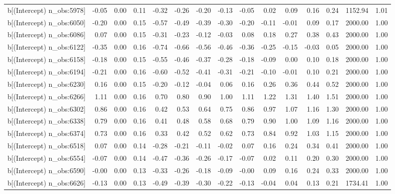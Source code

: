 \begin{table}[ht]
\begin{tabular}{rrrrrrrrrrrrrrr}
  b[(Intercept) n\_obs:5978] & -0.05 & 0.00 & 0.11 & -0.32 & -0.26 & -0.20 & -0.13 & -0.05 & 0.02 & 0.09 & 0.16 & 0.24 & 1152.94 & 1.01 \\ 
  b[(Intercept) n\_obs:6050] & -0.20 & 0.00 & 0.15 & -0.57 & -0.49 & -0.39 & -0.30 & -0.20 & -0.11 & -0.01 & 0.09 & 0.17 & 2000.00 & 1.00 \\ 
  b[(Intercept) n\_obs:6086] & 0.07 & 0.00 & 0.15 & -0.31 & -0.23 & -0.12 & -0.03 & 0.08 & 0.18 & 0.27 & 0.38 & 0.43 & 2000.00 & 1.00 \\ 
  b[(Intercept) n\_obs:6122] & -0.35 & 0.00 & 0.16 & -0.74 & -0.66 & -0.56 & -0.46 & -0.36 & -0.25 & -0.15 & -0.03 & 0.05 & 2000.00 & 1.00 \\ 
  b[(Intercept) n\_obs:6158] & -0.18 & 0.00 & 0.15 & -0.55 & -0.46 & -0.37 & -0.28 & -0.18 & -0.09 & 0.00 & 0.10 & 0.18 & 2000.00 & 1.00 \\ 
  b[(Intercept) n\_obs:6194] & -0.21 & 0.00 & 0.16 & -0.60 & -0.52 & -0.41 & -0.31 & -0.21 & -0.10 & -0.01 & 0.10 & 0.21 & 2000.00 & 1.00 \\ 
  b[(Intercept) n\_obs:6230] & 0.16 & 0.00 & 0.15 & -0.20 & -0.12 & -0.04 & 0.06 & 0.16 & 0.26 & 0.36 & 0.44 & 0.52 & 2000.00 & 1.00 \\ 
  b[(Intercept) n\_obs:6266] & 1.11 & 0.00 & 0.16 & 0.70 & 0.80 & 0.90 & 1.00 & 1.11 & 1.22 & 1.31 & 1.40 & 1.51 & 2000.00 & 1.00 \\ 
  b[(Intercept) n\_obs:6302] & 0.86 & 0.00 & 0.16 & 0.42 & 0.53 & 0.64 & 0.75 & 0.86 & 0.97 & 1.07 & 1.16 & 1.30 & 2000.00 & 1.00 \\ 
  b[(Intercept) n\_obs:6338] & 0.79 & 0.00 & 0.16 & 0.41 & 0.48 & 0.58 & 0.68 & 0.79 & 0.90 & 1.00 & 1.09 & 1.16 & 2000.00 & 1.00 \\ 
  b[(Intercept) n\_obs:6374] & 0.73 & 0.00 & 0.16 & 0.33 & 0.42 & 0.52 & 0.62 & 0.73 & 0.84 & 0.92 & 1.03 & 1.15 & 2000.00 & 1.00 \\ 
  b[(Intercept) n\_obs:6518] & 0.07 & 0.00 & 0.14 & -0.28 & -0.21 & -0.11 & -0.02 & 0.07 & 0.16 & 0.24 & 0.34 & 0.41 & 2000.00 & 1.00 \\ 
  b[(Intercept) n\_obs:6554] & -0.07 & 0.00 & 0.14 & -0.47 & -0.36 & -0.26 & -0.17 & -0.07 & 0.02 & 0.11 & 0.20 & 0.30 & 2000.00 & 1.00 \\ 
  b[(Intercept) n\_obs:6590] & -0.00 & 0.00 & 0.13 & -0.33 & -0.26 & -0.18 & -0.09 & -0.00 & 0.09 & 0.16 & 0.24 & 0.33 & 2000.00 & 1.00 \\ 
  b[(Intercept) n\_obs:6626] & -0.13 & 0.00 & 0.13 & -0.49 & -0.39 & -0.30 & -0.22 & -0.13 & -0.04 & 0.04 & 0.13 & 0.21 & 1734.41 & 1.00 \\ 

\end{tabular}
\end{table}

